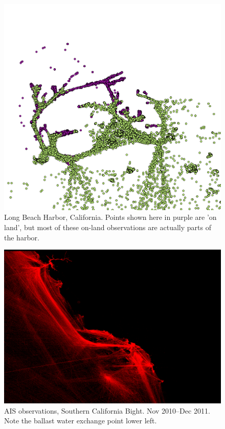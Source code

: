 \begin{figure}[htbp]
  \centering
  \includegraphics[width=140mm]{figures/example-long-beach-harbor-validation.png}
  \caption[Long beach harbor, validation example]{Long Beach Harbor, California. Points shown here in purple are 'on land', but most of these on-land observations are actually parts of the harbor.} %
  \label{fig:longbeach-validation}
\end{figure}


\begin{figure}[htbp]
  \centering
  \includegraphics[width=140mm]{figures/cargo_density.png}
  \caption[AIS observations, Southern California Bight]{AIS observations, Southern California Bight. Nov 2010--Dec 2011. Note the ballast water exchange point lower left.}
  \label{fig:cal-cargo}
\end{figure}

